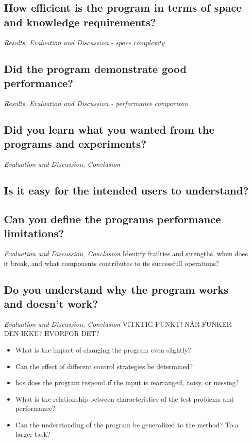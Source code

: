 \subsection{How efficient is the program in terms of space and knowledge requirements?}
\emph{\color{orange} Results, Evaluation and Discussion - space complexity}
\subsection{Did the program demonstrate good performance?}
\emph{\color{orange} Results, Evaluation and Discussion - performance comparison}
\subsection{Did you learn what you wanted from the programs and experiments?}
\emph{\color{orange} Evaluation and Discussion, Conclusion}
\subsection{Is it easy for the intended users to understand?}
\subsection{Can you define the programs performance limitations?}
\emph{\color{orange} Evaluation and Discussion, Conclusion}
Identify frailties and strengths. when does it break, and what components contributes to its successfull operations?
\subsection{Do you understand why the program works and doesn't work?}
\emph{\color{orange} Evaluation and Discussion, Conclusion}
VITKTIG PUNKT! NÅR FUNKER DEN IKKE? HVORFOR DET? 
\begin{itemize}
\item What is the impact of changing the program even slightly?
\item Can the effect of different control strategies be determined?
\item hos does the program respond if the input is rearranged, noisy, or missing?
\item What is the relationship between characteristics of the test problems and performance?
\item Can the understanding of the program be generalized to the method? To a larger task?
\end{itemize}